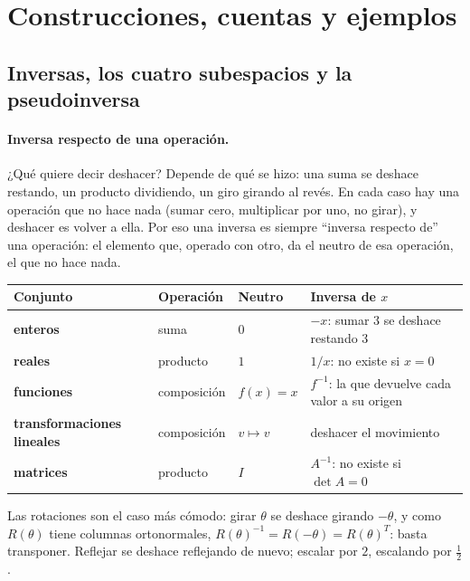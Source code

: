 
\section{Construcciones, cuentas y ejemplos}

\subsection{Inversas, los cuatro subespacios y la pseudoinversa}\label{sec:pseudoinversa}

\paragraph{Inversa respecto de una operación.} ¿Qué quiere decir deshacer? Depende de qué se
hizo: una suma se deshace restando, un producto dividiendo, un giro girando al revés. En cada caso hay una operación
que no hace nada (sumar cero, multiplicar por uno, no girar), y deshacer es volver a ella.
Por eso una inversa es siempre \enquote{inversa respecto
de} una operación: el elemento que, operado con otro, da el neutro de esa operación, el que
no hace nada.

{\small
\begin{center}
\begin{tabularx}{.92\textwidth}{>{\bfseries}l l l Y}
\toprule
Conjunto & Operación & Neutro & Inversa de \(x\)\\
\midrule
enteros & suma & \(0\) & \(-x\): sumar \(3\) se deshace restando \(3\)\\
reales & producto & \(1\) & \(1/x\): no existe si \(x=0\)\\
funciones & composición & \(f(x)=x\) & \(f^{-1}\): la que devuelve cada valor a su origen\\
transformaciones lineales & composición & \(v\mapsto v\) & deshacer el movimiento\\
matrices & producto & \(I\) & \(A^{-1}\): no existe si \(\det A=0\)\\
\bottomrule
\end{tabularx}
\end{center}
}

Las rotaciones son el caso más cómodo: girar \(\theta\) se deshace girando \(-\theta\), y como
\(R(\theta)\) tiene columnas ortonormales, \(R(\theta)^{-1}=R(-\theta)=R(\theta)^T\): basta
transponer. Reflejar se deshace reflejando de nuevo; escalar por \(2\), escalando por
\(\tfrac12\).

